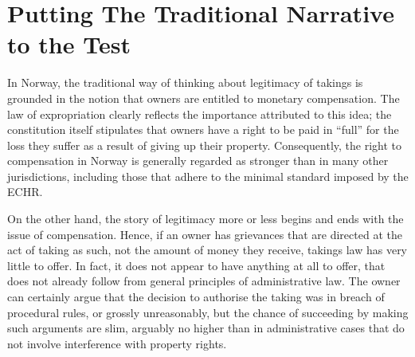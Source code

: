 
\section{Putting The Traditional Narrative to the Test}

In Norway, the traditional way of thinking about legitimacy of takings is grounded in the notion that owners are entitled to monetary compensation. The law of expropriation clearly reflects the importance attributed to this idea; the constitution itself stipulates that owners have a right to be paid in ``full'' for the loss they suffer as a result of giving up their property. Consequently, the right to compensation in Norway is generally regarded as stronger than in many other jurisdictions, including those that adhere to the minimal standard imposed by the ECHR.

On the other hand, the story of legitimacy more or less begins and ends with the issue of compensation. Hence, if an owner has grievances that are directed at the act of taking as such, not the amount of money they receive, takings law has very little to offer. In fact, it does not appear to have anything at all to offer, that does not already follow from general principles of administrative law. The owner can certainly argue that the decision to authorise the taking was in breach of procedural rules, or grossly unreasonably, but the chance of succeeding by making such arguments are slim, arguably no higher than in administrative cases that do not involve interference with property rights.

